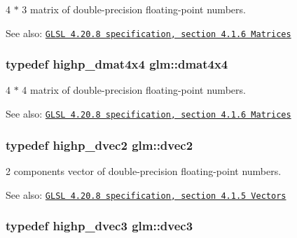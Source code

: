 4 $\ast$ 3 matrix of double-precision floating-point numbers.

\begin{Desc}
\item[See also:]\href{http://www.opengl.org/registry/doc/GLSLangSpec.4.20.8.pdf}{\tt GLSL 4.20.8 specification, section 4.1.6 Matrices} \end{Desc}
\hypertarget{group__core__types_g54d90d4b902d93638b906571af215bb1}{
\subsubsection[dmat4x4]{\setlength{\rightskip}{0pt plus 5cm}typedef highp\_\-dmat4x4 {\bf glm::dmat4x4}}}
\label{group__core__types_g54d90d4b902d93638b906571af215bb1}


4 $\ast$ 4 matrix of double-precision floating-point numbers.

\begin{Desc}
\item[See also:]\href{http://www.opengl.org/registry/doc/GLSLangSpec.4.20.8.pdf}{\tt GLSL 4.20.8 specification, section 4.1.6 Matrices} \end{Desc}
\hypertarget{group__core__types_ge6727259898288cae197724d5f172b3b}{
\subsubsection[dvec2]{\setlength{\rightskip}{0pt plus 5cm}typedef highp\_\-dvec2 {\bf glm::dvec2}}}
\label{group__core__types_ge6727259898288cae197724d5f172b3b}


2 components vector of double-precision floating-point numbers.

\begin{Desc}
\item[See also:]\href{http://www.opengl.org/registry/doc/GLSLangSpec.4.20.8.pdf}{\tt GLSL 4.20.8 specification, section 4.1.5 Vectors} \end{Desc}
\hypertarget{group__core__types_g7f3287f952e6ccb481231368091702ac}{
\subsubsection[dvec3]{\setlength{\rightskip}{0pt plus 5cm}typedef highp\_\-dvec3 {\bf glm::dvec3}}}
\label{group__core__types_g7f3287f952e6ccb481231368091702ac}


